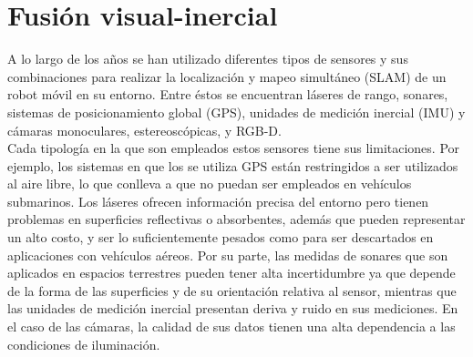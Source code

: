 
\section{Fusión visual-inercial }
A lo largo de los años se han utilizado diferentes tipos de sensores y sus combinaciones para realizar la localización y mapeo simultáneo (SLAM) de un robot móvil en su entorno. Entre éstos se encuentran láseres de rango, sonares, sistemas de posicionamiento global (GPS), unidades de medición inercial (IMU) y cámaras monoculares, estereoscópicas, y RGB-D.\\

Cada tipología en la que son empleados estos sensores tiene sus limitaciones. Por ejemplo, los sistemas en que los se utiliza GPS están restringidos a ser utilizados al aire libre, lo que conlleva a que no puedan ser empleados en vehículos submarinos. Los láseres ofrecen información precisa del entorno pero tienen problemas en superficies reflectivas o absorbentes, además que pueden representar un alto costo,  y  ser lo suficientemente pesados como para ser descartados en aplicaciones con  vehículos aéreos. Por su parte, las medidas de sonares que son aplicados en espacios terrestres pueden tener alta incertidumbre ya que depende de la forma de las superficies y de su orientación relativa al sensor, mientras que las unidades de medición inercial presentan deriva y ruido en sus mediciones. En el caso de las cámaras, la  calidad de sus datos tienen una alta dependencia a las condiciones de iluminación. \\

